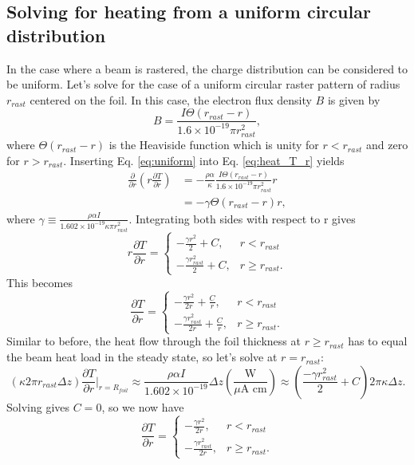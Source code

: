 \documentclass[12pt]{article}
\begin{document}
\subsection{Solving for heating from a uniform circular distribution}
In the case where a beam is rastered, the charge distribution can be considered to be uniform. Let's solve for the case of a uniform circular raster pattern of radius $r_{rast}$ centered on the foil. In this case, the electron flux density $B$ is given by
\begin{equation}
\label{eq:uniform}
B=\frac{I\Theta (r_{rast}-r)}{1.6\times 10^{-19}\pi r_{rast}^2},
\end{equation}
where $\Theta (r_{rast}-r)$ is the Heaviside function which is unity for $r<r_{rast}$ and  zero for $r>r_{rast}$. Inserting Eq. \ref{eq:uniform} into Eq. \ref{eq:heat_T_r} yields
\begin{align}
\frac{\partial}{\partial r}\left(r\frac{\partial T}{\partial r}\right)&=-\frac{\rho\alpha}{\kappa}\frac{I\Theta (r_{rast}-r)}{1.6\times 10^{-19}\pi r_{rast}^2}r\\
~&=-\gamma \Theta (r_{rast}-r)r,
\end{align}
where $\gamma\equiv\frac{\rho\alpha I}{1.602\times10^{-19}\kappa\pi r_{rast}^2}$. Integrating both sides with respect to r gives
\[
r\frac{\partial T}{\partial r}=
\begin{cases}
-\frac{\gamma r^2}{2}+C, & r<r_{rast}\\
-\frac{\gamma r_{rast}^2}{2}+C, & r\geq r_{rast}.
\end{cases}
\]
This becomes
\[
\frac{\partial T}{\partial r}=
\begin{cases}
-\frac{\gamma r^2}{2r}+\frac{C}{r}, & r<r_{rast}\\
-\frac{\gamma r_{rast}^2}{2r}+\frac{C}{r}, & r\geq r_{rast}.
\end{cases}
\]
Similar to before, the heat flow through the foil thickness at $r\geq r_{rast} $ has to equal the beam heat load in the steady state, so let's solve at $r=r_{rast}$:
\[
\left(\kappa2\pi r_{rast}\Delta z\right) \frac{\partial T}{\partial r}|_{r=R_{foil}}\approx \frac{\rho\alpha I}{1.602\times 10^{-19}}\Delta z\left(\frac{\textrm{W}}{\mu \textrm{A cm}}\right)\approx\left( \frac{-\gamma r_{rast}^2}{2}+C\right)2\pi\kappa\Delta z.
\]
Solving gives $C=0$, so we now have
\begin{equation}
\label{eq:uniform_cases}
\frac{\partial T}{\partial r}=
\begin{cases}
-\frac{\gamma r^2}{2r}, & r<r_{rast}\\
-\frac{\gamma r_{rast}^2}{2r}, & r\geq r_{rast}.
\end{cases}
\end{equation}
\end{document}
